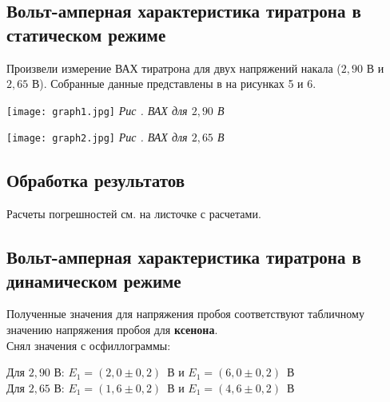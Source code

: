 \subsection{Вольт-амперная характеристика тиратрона в статическом режиме}

Произвели измерение ВАХ тиратрона для двух напряжений накала ($ 2,90 $ В и $ 2,65 $ В).
Собранные данные представлены в на рисунках 5 и 6.

\begin{center}

    {
        \begin{center}
            \texttt{[image: graph1.jpg]}
            \textit{Рис . ВАХ для $ 2,90 $ В}
        \end{center}
    
    } 
    {
        \begin{center}
            \texttt{[image: graph2.jpg]}
            \textit{Рис . ВАХ для $ 2,65 $ В}
        \end{center}
    
    }
    
    \end{center}

\newpage{}

\subsection{Обработка результатов}

Расчеты погрешностей см. на листочке с расчетами.

\subsection{Вольт-амперная характеристика тиратрона в динамическом режиме}

Полученные значения для напряжения пробоя соответствуют табличному значению напряжения
пробоя для \textbf{ксенона}. \\

Снял значения с осфиллограммы:

Для $ 2,90 $ В: $ E_1 = \left( 2,0 \pm 0,2 \right) \, $ В и
$ E_1 = \left( 6,0 \pm 0,2 \right) \, $ В \\
Для $ 2,65 $ В: $ E_1 = \left( 1,6 \pm 0,2 \right) \, $ В и
$ E_1 = \left( 4,6 \pm 0,2 \right) \, $ В \\

